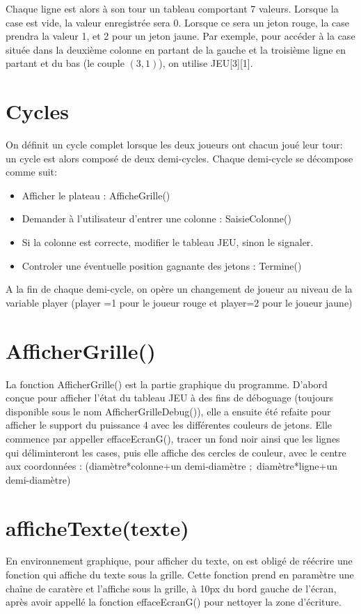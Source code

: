 \documentclass[a4paper]{report}
\begin{document}
Chaque ligne est alors à son tour un tableau comportant 7 valeurs. Lorsque la case est vide, la valeur enregistrée sera 0. Lorsque ce sera un jeton rouge, la case prendra la valeur 1, et 2 pour un jeton jaune.
Par exemple, pour accéder à la case située dans la deuxième colonne en partant de la gauche et la troisième ligne en partant et du bas (le couple $(3,1)$), on utilise JEU[3][1].


\section*{Cycles}
On définit un cycle complet lorsque les deux joueurs ont chacun joué leur tour: un cycle est alors composé de deux demi-cycles.
Chaque demi-cycle se décompose comme suit:
\begin{itemize}
\item Afficher le plateau : AfficheGrille()
\item Demander à l'utilisateur d'entrer une colonne : SaisieColonne()
\item Si la colonne est correcte, modifier le tableau JEU, sinon le signaler.
\item Controler une éventuelle position gagnante des jetons : Termine()
\end{itemize}
A la fin de chaque demi-cycle, on opère un changement de joueur au niveau de la variable player (player =1 pour le joueur rouge et player=2 pour le joueur jaune)

\section*{AfficherGrille()}
La fonction AfficherGrille() est la partie graphique du programme. D'abord conçue pour afficher l'état du tableau JEU à des fins de déboguage (toujours disponible sous le nom AfficherGrilleDebug()), elle a ensuite été refaite pour afficher le support du puissance 4 avec les différentes couleurs de jetons.
Elle commence par appeller effaceEcranG(), tracer un fond noir ainsi que les lignes qui déliminteront les cases, puis elle affiche des cercles de couleur, avec le centre aux coordonnées : (diamètre*colonne+un demi-diamètre $;$ diamètre*ligne+un demi-diamètre)


\section*{afficheTexte(texte)}
En environnement graphique, pour afficher du texte, on est obligé de réécrire une fonction qui affiche du texte sous la grille. Cette fonction prend en paramètre une chaîne de caratère et l'affiche sous la grille, à 10px du bord gauche de l'écran, après avoir appellé la fonction effaceEcranG() pour nettoyer la zone d'écriture.
\end{document}
